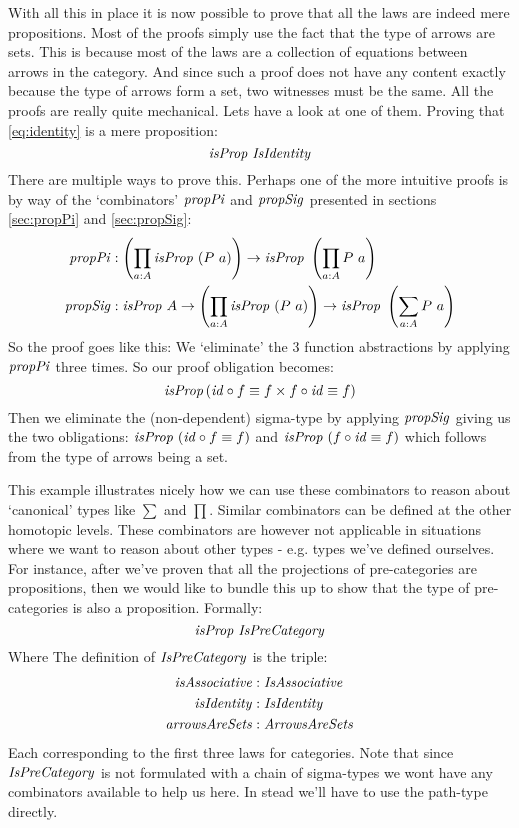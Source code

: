With all this in place it is now possible to prove that all the laws are indeed
mere propositions. Most of the proofs simply use the fact that the type of
arrows are sets. This is because most of the laws are a collection of equations
between arrows in the category. And since such a proof does not have any content
exactly because the type of arrows form a set, two witnesses must be the same.
All the proofs are really quite mechanical. Lets have a look at one of them.
Proving that \ref{eq:identity} is a mere proposition:
%
\begin{equation}
  \mathit{isProp}\ \mathit{IsIdentity}
\end{equation}
%
There are multiple ways to prove this. Perhaps one of the more intuitive proofs
is by way of the `combinators' $\mathit{propPi}$ and $\mathit{propSig}$ presented in sections
\ref{sec:propPi} and \ref{sec:propSig}:
%
\begin{align*}
\var{propPi} & \tp \left(\prod_{a \tp A} \isProp\ (P\ a)\right) \to \isProp\ \left(\prod_{a \tp A} P\ a\right)
  \\
\var{propSig} & \tp \isProp\ A \to \left(\prod_{a \tp A} \isProp\ (P\ a)\right) \to \isProp\ \left(\sum_{a \tp A} P\ a\right)
\end{align*}
%
So the proof goes like this: We `eliminate' the 3 function abstractions by
applying $\mathit{propPi}$ three times. So our proof obligation becomes:
%
$$
\mathit{isProp} \left( \mathit{id} \circ f \equiv f \times f \circ \mathit{id} \equiv f \right)
$$
%
Then we eliminate the (non-dependent) sigma-type by applying $\mathit{propSig}$ giving
us the two obligations: $\mathit{isProp}\ (\mathit{id} \circ f \equiv f)$ and $\mathit{isProp}\ (f \circ
\mathit{id} \equiv f)$ which follows from the type of arrows being a
set.

This example illustrates nicely how we can use these combinators to reason about
`canonical' types like $\sum$ and $\prod$. Similar combinators can be defined
at the other homotopic levels. These combinators are however not applicable in
situations where we want to reason about other types - e.g. types we've defined
ourselves. For instance, after we've proven that all the projections of
pre-categories are propositions, then we would like to bundle this up to show
that the type of pre-categories is also a proposition. Formally:
%
\begin{equation}
\label{eq:propIsPreCategory}
\mathit{isProp}\ \mathit{IsPreCategory}
\end{equation}
%
Where The definition of $\mathit{IsPreCategory}$ is the triple:
%
\begin{align*}
\mathit{isAssociative} & \mathrel{:} \mathit{IsAssociative}\\
\mathit{isIdentity}    & \mathrel{:} \mathit{IsIdentity}\\
\mathit{arrowsAreSets} & \mathrel{:} \mathit{ArrowsAreSets}
\end{align*}
%
Each corresponding to the first three laws for categories. Note that since
$\mathit{IsPreCategory}$ is not formulated with a chain of sigma-types we wont have any
combinators available to help us here. In stead we'll have to use the path-type
directly.

